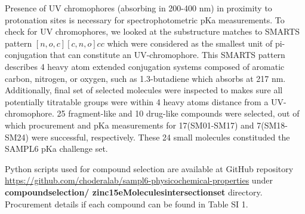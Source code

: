 \documentclass[9pt,lineno]{elife}
\begin{document}
Presence of UV chromophores (absorbing in 200-400 nm) in proximity to protonation sites is necessary for spectrophotometric pKa measurements. To check for UV chromophores, we looked at the substructure matches to SMARTS pattern $[n,o,c][c,n,o]cc$ which were considered as the smallest unit of pi-conjugation that can constitute an UV-chromophore. This SMARTS pattern describes 4 heavy atom extended conjugation systems composed of aromatic carbon, nitrogen, or oxygen, such as 1.3-butadiene which absorbs at 217 nm. Additionally, final set of selected molecules were inspected to makes sure all potentially titratable groups were within 4 heavy atoms distance from a UV-chromophore.
25 fragment-like and 10 drug-like compounds were selected, out of which procurement and pKa measurements for 17(SM01-SM17) and 7(SM18-SM24) were successful, respectively. These 24 small molecules constituded the SAMPL6 pKa challenge set.

Python scripts used for compound selection are available at GitHub repository \href{https://github.com/choderalab/sampl6\textendash physicochemical\textendash properties}{https://github.com/choderalab/sampl6-physicochemical-properties} under \textbf{compound\textunderscore selection/ zinc15\textunderscore eMolecules\textunderscore intersection\textunderscore set} directory. Procurement details if each compound can be found in Table SI 1.
\end{document}
